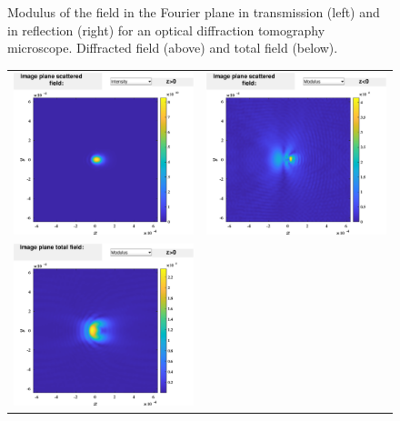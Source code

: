 \begin{figure}[H]
\begin{center}
\end{center}
\caption{Modulus of the field in the Fourier plane in transmission
  (left) and in reflection (right) for an optical diffraction
  tomography microscope. Diffracted field (above) and total field
  (below).}
\end{figure}

\begin{figure}[H]
\begin{center}
\begin{tabular}{cc}
  \includegraphics*[width=7.0cm,draft=false]{test2imagepos.eps}
&  \includegraphics*[width=7.0cm,draft=false]{test2imageneg.eps} \\
\includegraphics*[width=7.0cm,draft=false]{test2imageincpos.eps}

\end{tabular}
\end{center}
\end{figure}
